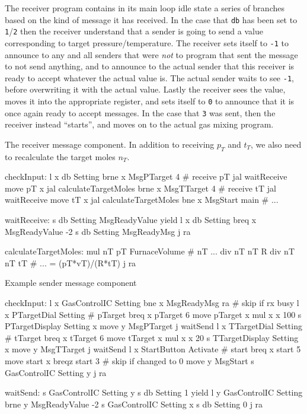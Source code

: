 \documentclass{article}
\begin{document}
The receiver program contains in its main loop idle state
a series of branches based on the kind of message it has received.
In the case that \verb+db+ has been set to \verb+1+/\verb+2+ then
the receiver understand that a sender is going to send a value corresponding
to target pressure/temperature. The receiver sets itself to \verb+-1+ to
announce to any and all senders that were \emph{not} to program that sent
the message to not send anything, and to announce to the actual sender that
this receiver is ready to accept whatever the actual value is. The actual
sender waits to see \verb+-1+, before overwriting it with the actual value.
Lastly the receiver sees the value, moves it into the appropriate register,
and sets itself to \verb+0+ to announce that it is once again ready to
accept messages. In the case that \verb+3+ was sent, then the receiver instead
``starts'', and moves on to the actual gas mixing program.
\vspace{1em}
\begin{paracol}{2}
    \noindent
    The receiver message component.
    In addition to receiving $p_T$ and $t_T$,
    we also need to recalculate the target moles $n_T$.
    \begin{mips}
        checkInput:
        l x db Setting
        brne x MsgPTarget 4 # receive pT
        jal waitReceive
        move pT x
        jal calculateTargetMoles
        brne x MsgTTarget 4 # receive tT
        jal waitReceive
        move tT x
        jal calculateTargetMoles
        bne x MsgStart main
        # ...

        waitReceive:
        s db Setting MsgReadyValue
        yield
        l x db Setting
        breq x MsgReadyValue -2
        s db Setting MsgReadyMsg
        j ra

        calculateTargetMoles:
        mul nT pT FurnaceVolume # nT ...
        div nT nT R
        div nT nT tT # ... = (pT*vT)/(R*tT)
        j ra
    \end{mips}
    \switchcolumn
    \noindent
    Example sender message component
    \begin{mips}
        checkInput:
        l x GasControlIC Setting
        bne x MsgReadyMsg ra # skip if rx busy
        l x PTargetDial Setting # pTarget
        breq x pTarget 6
        move pTarget x
        mul x x 100
        s PTargetDisplay Setting x
        move y MsgPTarget
        j waitSend
        l x TTargetDial Setting # tTarget
        breq x tTarget 6
        move tTarget x
        mul x x 20
        s TTargetDisplay Setting x
        move y MsgTTarget
        j waitSend
        l x StartButton Activate # start
        breq x start 5
        move start x
        breqz start 3 # skip if changed to 0
        move y MsgStart
        s GasControlIC Setting y
        j ra

        waitSend:
        s GasControlIC Setting y
        s db Setting 1
        yield
        l y GasControlIC Setting
        brne y MsgReadyValue -2
        s GasControlIC Setting x
        s db Setting 0
        j ra
    \end{mips}
\end{paracol}
\end{document}
